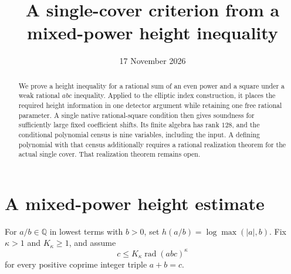 \documentclass[11pt,a4paper]{article}
\title{A single-cover criterion from a mixed-power height inequality}
\author{}\date{17 November 2026}
\newcommand{\Q}{\mathbb Q}\newcommand{\Z}{\mathbb Z}
\DeclareMathOperator{\rad}{rad}
\begin{document}
\maketitle

\begin{abstract}
We prove a height inequality for a rational sum of an even power and a
square under a weak rational \(abc\) inequality. Applied to the elliptic
index construction, it places the required height information in one
detector argument while retaining one free rational parameter. A single
native rational-square condition then gives soundness for sufficiently
large fixed coefficient shifts. Its finite algebra has rank \(128\),
and the conditional polynomial census is nine variables, including the
input. A defining polynomial with that census additionally requires a
rational realization theorem for the actual single cover. That realization theorem remains open.
\end{abstract}

\section{A mixed-power height estimate}

For \(a/b\in\Q\) in lowest terms with \(b>0\), set
\(h(a/b)=\log\max(|a|,b)\).
Fix \(\kappa>1\) and \(K_\kappa\ge1\), and assume
\begin{equation}\label{eq:abc}
 c\le K_\kappa\rad(abc)^\kappa
\end{equation}
for every positive coprime integer triple \(a+b=c\).
\end{document}
